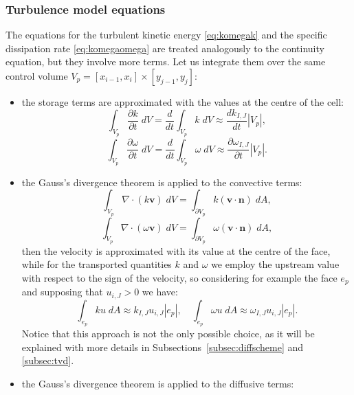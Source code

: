 \subsubsection{Turbulence model equations}
The equations for the turbulent kinetic energy \eqref{eq:komegak} and the 
specific dissipation rate \eqref{eq:komegaomega} are treated analogously to the 
continuity equation, but they involve more terms. Let us integrate them over 
the same control volume  $V_p = [x_{i-1},x_i] \times [y_{j-1},y_j]$:
\begin{itemize}
	\item the storage terms are approximated with the values at the centre of 
	the cell:
	\begin{equation}
	\int_{V_p} \frac{\partial k}{\partial t} \; dV = \frac{d}{dt} \int_{V_p}k 
	\; dV \approx \frac{dk_{I,J}}{dt}|V_p|,
	\end{equation}
	\begin{equation}
	\int_{V_p} \frac{\partial 
		\omega}{\partial t} \; dV = \frac{d}{dt} \int_{V_p} \omega \; dV 
		\approx 
	\frac{\partial \omega_{I,J}}{\partial t}|V_p|.
	\end{equation}
	\item the Gauss's divergence theorem is applied to the convective terms:
	\begin{equation}
	\int_{V_p} \nabla \cdot (k \mathbf{v}) \; dV = \int_{\partial V_p} k 
	(\mathbf{v} 
	\cdot \mathbf{n}) \; dA,
	\end{equation}
	\begin{equation}
	\int_{V_p} \nabla \cdot (\omega \mathbf{v}) \; dV = \int_{\partial V_p} 
	\omega 
	(\mathbf{v} \cdot \mathbf{n}) \; dA,
	\end{equation}
	then the velocity is approximated with its value at the centre of the face, 
	while for the transported quantities $k$ and $\omega$ we employ the 
	upstream value with respect to the sign of the velocity, so considering for 
	example the face $e_p$ and supposing that $u_{i,J}>0$ we have:
	\begin{equation}
	\int_{e_p} ku \; dA \approx k_{I,J}u_{i,J}|e_p|, \quad \int_{e_p} 
	\omega u \; dA \approx \omega_{I,J}u_{i,J}|e_p|.
	\end{equation}
	Notice that this approach is not the only possible choice, as it will be 
	explained with more details in Subsections~\ref{subsec:diffscheme} and 
	\ref{subsec:tvd}.
	\item the Gauss's divergence theorem is applied to the diffusive terms:	
	\begin{equation}

\end{equation}
\end{itemize}
